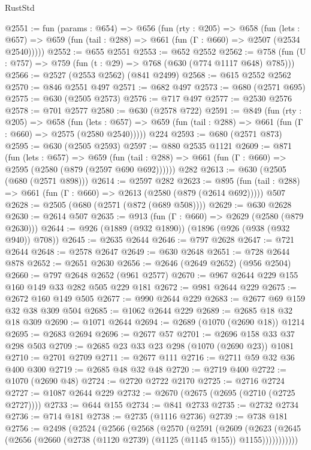 \begin{lexlean}{RustStd}
\begin{coremodule}
{\begin{coremodule}
{{{{{{{{{{@2551 := fun (params : @654) =>
  @656
    (fun (rty : @205) =>
    @658
      (fun (lets : @657) =>
      @659 (fun (tail : @288) => @661 (fun (Γ : @660) => @2507 (@2534 @2540)))))
@2552 := @655 @2551
@2553 := @652 @2552
@2562 := @758 (fun (U : @757) => @759 (fun (t : @29) => @768 (@630 (@774 @1117 @648) @785)))
@2566 := @2527 (@2553 @2562) (@841 @2499)
@2568 := @615 @2552 @2562
@2570 := @846 @2551 @497
@2571 := @682 @497
@2573 := @680 (@2571 @695)
@2575 := @630 (@2505 @2573)
@2576 := @717 @497
@2577 := @2530 @2576
@2578 := @701 @2577
@2580 := @630 (@2578 @722)
@2591 := @849
    (fun (rty : @205) =>
    @658
      (fun (lets : @657) =>
      @659 (fun (tail : @288) => @661 (fun (Γ : @660) => @2575 (@2580 @2540)))))
    @224
@2593 := @680 (@2571 @873)
@2595 := @630 (@2505 @2593)
@2597 := @880 @2535 @1121
@2609 := @871
    (fun (lets : @657) =>
    @659 (fun (tail : @288) => @661 (fun (Γ : @660) => @2595 (@2580 (@879 (@2597 @690 @692))))))
    @282
@2613 := @630 (@2505 (@680 (@2571 @898)))
@2614 := @2597 @282
@2623 := @895 (fun (tail : @288) => @661 (fun (Γ : @660) => @2613 (@2580 (@879 (@2614 @692))))) @507
@2628 := @2505 (@680 (@2571 (@872 (@689 @508))))
@2629 := @630 @2628
@2630 := @2614 @507
@2635 := @913 (fun (Γ : @660) => @2629 (@2580 (@879 @2630)))
@2644 := @926 (@1889 (@932 @1890)) (@1896 (@926 (@938 (@932 @940)) @708))
@2645 := @2635 @2644
@2646 := @797 @2628
@2647 := @721 @2644
@2648 := @2578 @2647
@2649 := @630 @2648
@2651 := @728 @2644 @878
@2652 := @2651 @2630
@2656 := @2646 (@2649 @2652) (@956 @2504)
@2660 := @797 @2648 @2652 (@961 @2577)
@2670 := @967 @2644 @229 @155 @160 @149 @33 @282 @505 @229 @181
@2672 := @981 @2644 @229
@2675 := @2672 @160 @149 @505
@2677 := @990 @2644 @229
@2683 := @2677 @69 @159 @32 @38 @309 @504
@2685 := @1062 @2644 @229
@2689 := @2685 @18 @32 @18 @309
@2690 := @1071 @2644
@2694 := @2689 (@1070 (@2690 @18)) @1214
@2695 := @2683 @2694
@2696 := @2677 @57
@2701 := @2696 @158 @33 @37 @298 @503
@2709 := @2685 @23 @33 @23 @298 (@1070 (@2690 @23)) @1081
@2710 := @2701 @2709
@2711 := @2677 @111
@2716 := @2711 @59 @32 @36 @400 @300
@2719 := @2685 @48 @32 @48
@2720 := @2719 @400
@2722 := @1070 (@2690 @48)
@2724 := @2720 @2722 @2170
@2725 := @2716 @2724
@2727 := @1087 @2644 @229
@2732 := @2670 (@2675 (@2695 (@2710 (@2725 @2727))))
@2733 := @644 @155
@2734 := @841 @2733
@2735 := @2732 @2734
@2736 := @714 @181
@2738 := @2735 (@1116 @2736)
@2739 := @738 @181
@2756 := @2498
    (@2524
      (@2566
        (@2568
          (@2570
            (@2591
              (@2609
                (@2623
                  (@2645 (@2656 (@2660 (@2738 (@1120 @2739) (@1125 (@1145 @155)) @1155)))))))))))
}}}}}}}}}}
\end{coremodule}}
\end{coremodule}
\end{lexlean}
